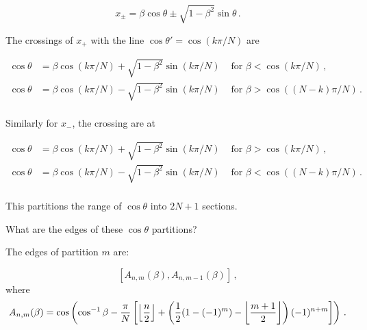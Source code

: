 \begin{equation}
x_\pm = \beta \cos\theta \pm \sqrt{1-\beta^2}\sin\theta\,.
\end{equation}

The crossings of $x_+$ with the line $\cos\theta' = \cos(k\pi/N)$ are

\begin{align*}
\cos\theta &= \beta\cos(k\pi/N) + \sqrt{1-\beta^2}\sin(k\pi/N) & \textrm{ for } \beta < \cos(k\pi/N)\,,\\
\cos\theta &= \beta\cos(k\pi/N) - \sqrt{1-\beta^2}\sin(k\pi/N) & \textrm{ for } \beta > \cos((N-k)\pi/N)\,.\\
\end{align*}

Similarly for $x_-$, the crossing are at 

\begin{align*}
\cos\theta &= \beta\cos(k\pi/N) + \sqrt{1-\beta^2}\sin(k\pi/N) & \textrm{ for } \beta > \cos(k\pi/N)\,,\\
\cos\theta &= \beta\cos(k\pi/N) - \sqrt{1-\beta^2}\sin(k\pi/N) & \textrm{ for } \beta < \cos((N-k)\pi/N)\,.\\
\end{align*}

This partitions the range of $\cos\theta$ into $2N+1$ sections.



What are the edges of these $\cos\theta$ partitions?




The edges of partition $m$ are:


\begin{equation}
\left[A_{n,m}(\beta), A_{n,m-1}(\beta)\right]\,,
\end{equation}
where
\begin{equation}
A_{n,m}(\beta) = \cos\left(\cos^{-1}{\beta} - \frac{\pi}{N}\left[\left \lfloor{\frac{n}{2}}\right \rfloor + \left(\frac{1}{2}(1 - (-1)^m) - \left \lfloor{\frac{m+1}{2}}\right \rfloor\right)(-1)^{n+m}\right]\right)\,.
\end{equation}

